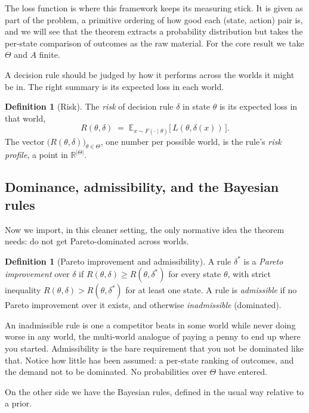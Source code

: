 \documentclass[10pt]{article}
\theoremstyle{definition}
\newtheorem{definition}[theorem]{Definition}
\theoremstyle{remark}
\newcommand{\R}{\mathbb{R}}
\newcommand{\E}{\mathbb{E}}
\begin{document}
The loss function is where this framework keeps its measuring stick. It is given as part of the problem, a primitive ordering of how good each (state, action) pair is, and we will see that the theorem extracts a probability distribution but takes the per-state comparison of outcomes as the raw material. For the core result we take $\Theta$ and $A$ finite.

A decision rule should be judged by how it performs across the worlds it might be in. The right summary is its expected loss in each world.

\begin{definition}[Risk]
\label{def:risk}
The \emph{risk} of decision rule $\delta$ in state $\theta$ is its expected loss in that world,
\[
R(\theta, \delta) \;=\; \E_{x \sim F(\cdot \mid \theta)}\big[\, L(\theta, \delta(x)) \,\big].
\]
The vector $\big(R(\theta, \delta)\big)_{\theta \in \Theta}$, one number per possible world, is the rule's \emph{risk profile}, a point in $\R^{|\Theta|}$.
\end{definition}

\subsection{Dominance, admissibility, and the Bayesian rules}

Now we import, in this cleaner setting, the only normative idea the theorem needs: do not get Pareto-dominated across worlds.

\begin{definition}[Pareto improvement and admissibility]
\label{def:admissible}
A rule $\delta^*$ is a \emph{Pareto improvement} over $\delta$ if $R(\theta, \delta) \ge R(\theta, \delta^*)$ for every state $\theta$, with strict inequality $R(\theta, \delta) > R(\theta, \delta^*)$ for at least one state. A rule is \emph{admissible} if no Pareto improvement over it exists, and otherwise \emph{inadmissible} (dominated).
\end{definition}

An inadmissible rule is one a competitor beats in some world while never doing worse in any world, the multi-world analogue of paying a penny to end up where you started. Admissibility is the bare requirement that you not be dominated like that. Notice how little has been assumed: a per-state ranking of outcomes, and the demand not to be dominated. No probabilities over $\Theta$ have entered.

On the other side we have the Bayesian rules, defined in the usual way relative to a prior.
\end{document}
